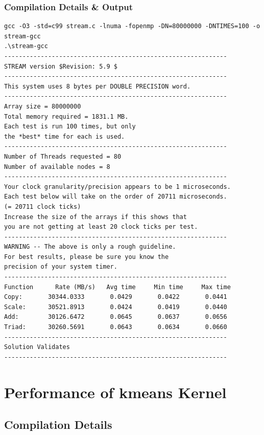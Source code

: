 \newpage
\subsubsection{Compilation Details \& Output}

\begin{center}
\begin{lstlisting}[basicstyle=\tiny]
gcc -O3 -std=c99 stream.c -lnuma -fopenmp -DN=80000000 -DNTIMES=100 -o stream-gcc
.\stream-gcc
-------------------------------------------------------------
STREAM version $Revision: 5.9 $
-------------------------------------------------------------
This system uses 8 bytes per DOUBLE PRECISION word.
-------------------------------------------------------------
Array size = 80000000
Total memory required = 1831.1 MB.
Each test is run 100 times, but only
the *best* time for each is used.
-------------------------------------------------------------
Number of Threads requested = 80
Number of available nodes = 8
-------------------------------------------------------------
Your clock granularity/precision appears to be 1 microseconds.
Each test below will take on the order of 20711 microseconds.
(= 20711 clock ticks)
Increase the size of the arrays if this shows that
you are not getting at least 20 clock ticks per test.
-------------------------------------------------------------
WARNING -- The above is only a rough guideline.
For best results, please be sure you know the
precision of your system timer.
-------------------------------------------------------------
Function      Rate (MB/s)   Avg time     Min time     Max time
Copy:       30344.0333       0.0429       0.0422       0.0441
Scale:      30521.8913       0.0424       0.0419       0.0440
Add:        30126.6472       0.0645       0.0637       0.0656
Triad:      30260.5691       0.0643       0.0634       0.0660
-------------------------------------------------------------
Solution Validates
-------------------------------------------------------------
\end{lstlisting}
\end{center}

\section{Performance of kmeans Kernel}

\subsection{Compilation Details}

